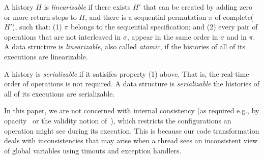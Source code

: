 A history $H$ is \emph{linearizable}
\cite{Herlihy:1990:LCC:78969.78972} if there exists $H'$ that can be created by adding zero or more 
return steps to $H$, and there is a sequential permutation $\pi$ of complete($H'$), 
such that: (1) $\pi$ belongs to the sequential specification; and 
(2) every pair of operations that are not interleaved in $\sigma$, appear in the same order in $\sigma$ and in $\pi$. 
A data structure  is \emph{linearizable}, also called \emph{atomic}, if the histories of all of its executions are linearizable.

A history is \emph{serializable} if it satisifes property (1) above. That is, the real-time order of operations is not required.
A data structure  is \emph{serializable} the histories of all of its executions are serializable.

In this paper, we are not concerned with internal consistency (as required e.g., by opacity~\cite{opacity} or the validity notion of~\cite{Kfir}), which 
restricts the configurations an operation might see during its execution. 
This is because our code transformation deals with inconsistencies that may arise when a thread sees an inconsistent view of global variables using 
timouts and exception handlers.   


